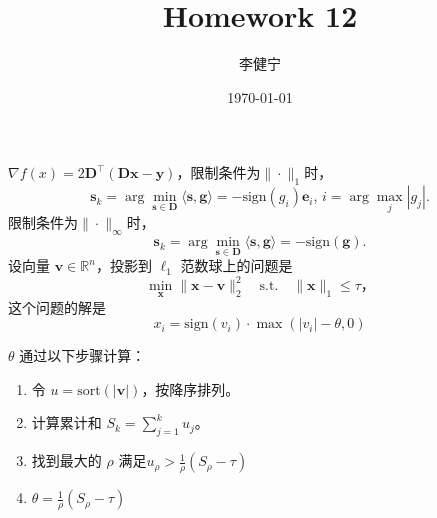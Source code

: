 \documentclass{homework}
\author{李健宁}
\date{\today}
\title{Homework 12}
\newcommand{\bfx}{\mathbf{x}}
\begin{document}
 \maketitle

\question

\begin{sol}
    $\nabla f(x) = 2\mathbf{D}^\top (\mathbf{D}\bfx - \mathbf{y})$，限制条件为$\|\cdot\|_1$时，
    \[
    \mathbf{s}_k = \arg\min_{\mathbf{s}\in \mathbf{D}}\langle\mathbf{s},\mathrm{\textbf{g}}\rangle = -\text{sign}(g_i)\mathbf{\textbf{e}}_i, \, i = \arg\max_j |g_j|.
    \]
    限制条件为$\|\cdot\|_\infty$时，
    \[
    \mathbf{s}_k = \arg\min_{\mathbf{s}\in \mathbf{D}}\langle\mathbf{s},\mathrm{\textbf{g}}\rangle = -\text{sign}(\mathrm {\textbf{g}}).
    \]
    设向量 $\mathbf{v} \in \mathbb{R}^n$，投影到 $\ell_1$ 范数球上的问题是
\[
\min_{\mathbf{x}} \|\mathbf{x} - \mathbf{v}\|_2^2 \quad \text{s.t.} \quad \|\mathbf{x}\|_1 \leq \tau，
\]
这个问题的解是
\[
x_i = \mathrm{sign}(v_i) \cdot \max\left(|v_i| - \theta, 0\right)
\]

 $\theta$ 通过以下步骤计算：
\begin{enumerate}
  \item 令 $u = \mathrm{sort}(|\mathbf{v}|)$，按降序排列。
  \item 计算累计和 $S_k = \sum_{j=1}^{k} u_j$。
  \item 找到最大的 $\rho$ 满足$  u_\rho > \frac{1}{\rho} \left(S_\rho - \tau \right)$
  \item $\theta = \frac{1}{\rho} \left(S_\rho - \tau\right)
  $
\end{enumerate}


\end{sol}
\end{document}

